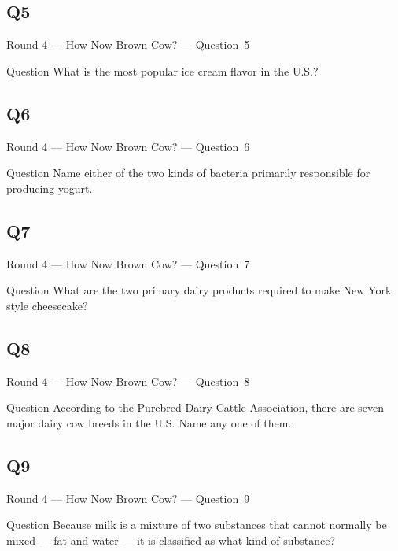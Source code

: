 \documentclass[11pt]{beamer}
\begin{document}
\subsection*{Q5}
\begin{frame}[t]{Round 4 --- How Now Brown Cow? --- \mbox{Question 5}}
\vspace{-0.5em}
\begin{block}{Question}
What is the most popular ice cream flavor in the U.S.?
\end{block}
\end{frame}
\subsection*{Q6}
\begin{frame}[t]{Round 4 --- How Now Brown Cow? --- \mbox{Question 6}}
\vspace{-0.5em}
\begin{block}{Question}
Name either of the two kinds of bacteria primarily responsible for producing yogurt.
\end{block}
\end{frame}
\subsection*{Q7}
\begin{frame}[t]{Round 4 --- How Now Brown Cow? --- \mbox{Question 7}}
\vspace{-0.5em}
\begin{block}{Question}
What are the two primary dairy products required to make New York style cheesecake?
\end{block}
\end{frame}
\subsection*{Q8}
\begin{frame}[t]{Round 4 --- How Now Brown Cow? --- \mbox{Question 8}}
\vspace{-0.5em}
\begin{block}{Question}
According to the Purebred Dairy Cattle Association, there are seven major dairy cow breeds in the U.S\@. Name any one of them.
\end{block}
\end{frame}
\subsection*{Q9}
\begin{frame}[t]{Round 4 --- How Now Brown Cow? --- \mbox{Question 9}}
\vspace{-0.5em}
\begin{block}{Question}
Because milk is a mixture of two substances that cannot normally be mixed --- fat and water --- it is classified as what kind of substance?
\end{block}
\end{frame}
\end{document}
